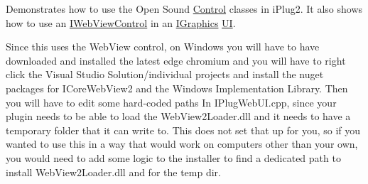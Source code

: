 Demonstrates how to use the Open Sound \mbox{\hyperlink{struct_control}{Control}} classes in i\+Plug2. It also shows how to use an \mbox{\hyperlink{class_i_web_view_control}{I\+Web\+View\+Control}} in an \mbox{\hyperlink{class_i_graphics}{I\+Graphics}} \mbox{\hyperlink{class_u_i}{UI}}.

Since this uses the Web\+View control, on Windows you will have to have downloaded and installed the latest edge chromium and you will have to right click the Visual Studio Solution/individual projects and install the nuget packages for I\+Core\+Web\+View2 and the Windows Implementation Library. Then you will have to edit some hard-\/coded paths In I\+Plug\+Web\+U\+I.\+cpp, since your plugin needs to be able to load the Web\+View2\+Loader.\+dll and it needs to have a temporary folder that it can write to. This does not set that up for you, so if you wanted to use this in a way that would work on computers other than your own, you would need to add some logic to the installer to find a dedicated path to install Web\+View2\+Loader.\+dll and for the temp dir. 